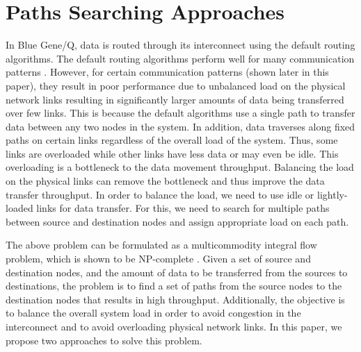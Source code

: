 \section{Paths Searching Approaches}
\label{sec:approach}


In Blue Gene/Q, data is routed through its interconnect using the default routing algorithms. The default routing algorithms perform well for many communication patterns \cite{Chen:BGQ}. However, for certain communication patterns (shown later in this paper), they result in poor performance due to unbalanced load on the physical network links resulting in significantly larger amounts of data being transferred over few links. This is because the default algorithms use a single path to transfer data between any two nodes in the system. In addition, data traverses along fixed paths on certain links regardless of the overall load of the system. Thus, some links are overloaded while other links have less data or may even be idle. This overloading is a bottleneck to the data movement throughput. Balancing the load on the physical links can remove the bottleneck and thus improve the data transfer throughput. In order to balance the load, we need to use idle or lightly-loaded links for data transfer. For this, we need to search for multiple paths between source and destination nodes and assign appropriate load on each path.

The above problem can be formulated as a multicommodity integral flow problem, which is shown to be NP-complete \cite{even1975}. Given a set of source and destination nodes, and the amount of data to be transferred from the sources to destinations, the problem is to find a set of paths from the source nodes to the destination nodes that results in high throughput. Additionally, the objective is to balance the overall system load in order to avoid congestion in the interconnect and to avoid overloading physical network links. In this paper, we propose two approaches to solve this problem.

